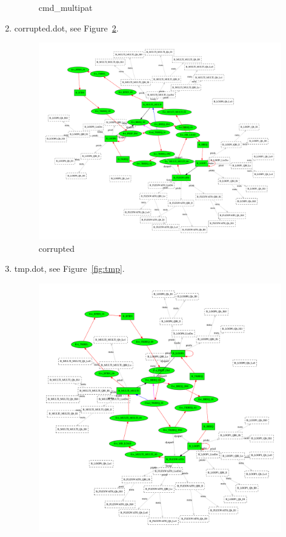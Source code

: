 \documentclass[12pt,a4paper]{report}
\begin{document}
\begin{enumerate}
\begin{figure}
        \caption{cmd\_multipat}
        \label{fig:cmd_multipat}
    \end{figure}
\item corrupted.dot, see Figure~\ref{fig:corrupted}.
    \begin{figure}
        \centering 
        \includegraphics*[width=1.0\textwidth,keepaspectratio]{TestPattern/corrupted.pdf}
        \caption{corrupted}
        \label{fig:corrupted}
    \end{figure}
\item tmp.dot, see Figure~\ref{fig:tmp}.
    \begin{figure}
        \centering 
        \includegraphics*[width=1.0\textwidth,keepaspectratio]{TestPattern/tmp.pdf}

\end{figure}
\end{enumerate}
\end{document}

